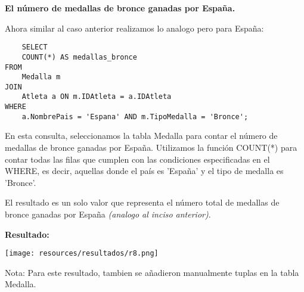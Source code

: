 \textbf{El número de medallas de bronce ganadas por España.}\vspace{.3cm}

Ahora similar al caso anterior realizamos lo analogo pero para España: \vspace{.3cm}

\begin{lstlisting}
    SELECT 
    COUNT(*) AS medallas_bronce
FROM 
    Medalla m
JOIN 
    Atleta a ON m.IDAtleta = a.IDAtleta
WHERE 
    a.NombrePais = 'Espana' AND m.TipoMedalla = 'Bronce';
\end{lstlisting}

\vspace{.3cm}

En esta consulta, seleccionamos la tabla Medalla para contar el número de medallas de bronce ganadas por España. Utilizamos la función COUNT(*) para contar todas las filas que cumplen con las condiciones especificadas en el WHERE, es decir, aquellas donde el país es 'España' y el tipo de medalla es 'Bronce'. \vspace{.3cm}

El resultado es un solo valor que representa el número total de medallas de bronce ganadas por España \textit{(analogo al inciso anterior)}. \vspace{.3cm}

\textbf{Resultado:}
\begin{center}
    \texttt{[image: resources/resultados/r8.png]}
\end{center}   

Nota: Para este resultado, tambien se añadieron manualmente tuplas en la tabla Medalla. \vspace{.3cm}